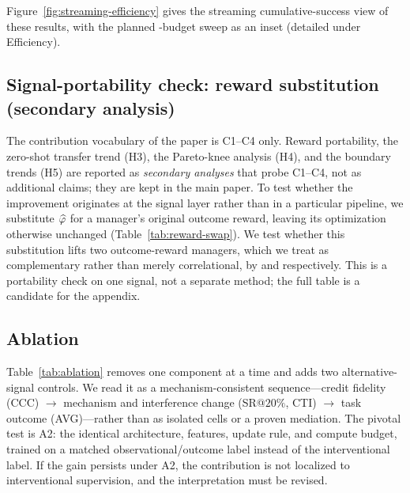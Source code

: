 

Figure~\ref{fig:streaming-efficiency} gives the streaming cumulative-success view
of these results, with the planned \rit{}-budget sweep as an inset (detailed under
Efficiency).



\subsection{Signal-portability check: reward substitution (secondary analysis)}
The contribution vocabulary of the paper is C1--C4 only. Reward portability, the
zero-shot transfer trend (H3), the Pareto-knee analysis (H4), and the boundary
trends (H5) are reported as \emph{secondary analyses} that probe C1--C4, not as
additional claims; they are kept in the main paper. To test whether the improvement
originates at the signal layer rather than in a
particular pipeline, we substitute $\widehat{\varphi}$ for a manager's original outcome
reward, leaving its optimization otherwise unchanged
(Table~\ref{tab:reward-swap}). We test whether this substitution lifts two
outcome-reward managers, which we treat as complementary rather than merely
correlational, by  and
 respectively. This is a portability check on one
signal, not a separate method; the full table is a candidate for the appendix.



\subsection{Ablation}
Table~\ref{tab:ablation} removes one component at a time and adds two
alternative-signal controls. We read it as a mechanism-consistent sequence---credit
fidelity (CCC) $\rightarrow$ mechanism and interference change (SR@$20\%$, CTI)
$\rightarrow$ task outcome (AVG)---rather than as isolated cells or a proven
mediation. The pivotal test is A2: the identical \aca{} architecture, features,
update rule, and compute budget, trained on a matched observational/outcome label
instead of the interventional label. If the gain persists under A2, the
contribution is not localized to interventional supervision, and the interpretation
must be revised.




